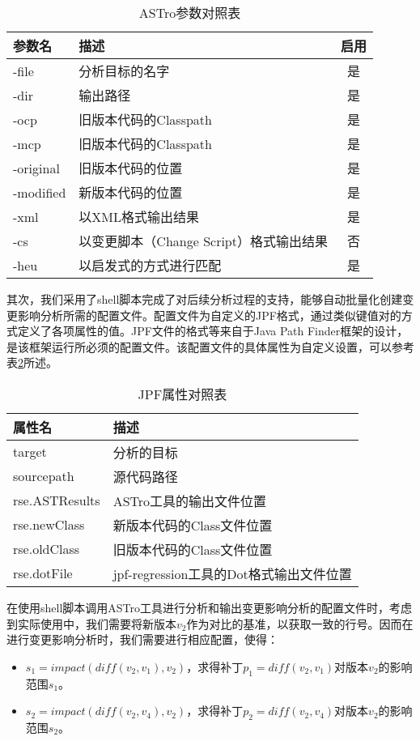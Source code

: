 \begin{table}
	\caption{ASTro参数对照表}
	\label{ASTro}
	\centering
	\begin{tabular}{llc}
		\toprule[1.5pt] 
		{\heiti 参数名} & {\heiti 描述} & {\heiti 启用}\\\midrule[1pt]
		-file & 分析目标的名字 & 是 \\
		-dir & 输出路径 & 是 \\
		-ocp & 旧版本代码的Classpath & 是\\
		-mcp & 旧版本代码的Classpath & 是\\
		-original    & 旧版本代码的位置 & 是\\
		-modified   & 新版本代码的位置 & 是\\
		-xml   & 以XML格式输出结果 & 是\\
		-cs   & 以变更脚本（Change Script）格式输出结果 & 否\\
		-heu   & 以启发式的方式进行匹配 & 是\\
		\bottomrule[1.5pt]
	\end{tabular}	
\end{table}

其次，我们采用了shell脚本完成了对后续分析过程的支持，能够自动批量化创建变更影响分析所需的配置文件。配置文件为自定义的JPF格式，通过类似键值对的方式定义了各项属性的值。JPF文件的格式等来自于Java Path Finder框架的设计，是该框架运行所必须的配置文件。该配置文件的具体属性为自定义设置，可以参考表\ref {JPF_prop}所述。

\begin{table}
	\caption{JPF属性对照表}
	\label{JPF_prop}
	\centering
	    \begin{tabular*}{\linewidth}{lp{10cm}}
	    	\toprule[1.5pt]
	    	{\heiti 属性名} & {\heiti 描述} \\\midrule[1pt]
	    	target & 分析的目标 \\
	    	sourcepath & 源代码路径\\
	    	rse.ASTResults & ASTro工具的输出文件位置\\
	    	rse.newClass & 新版本代码的Class文件位置\\
	    	rse.oldClass    & 旧版本代码的Class文件位置\\
	    	rse.dotFile   & jpf-regression工具的Dot格式输出文件位置\\
	    	\bottomrule[1.5pt]
	    \end{tabular*}
\end{table}

在使用shell脚本调用ASTro工具进行分析和输出变更影响分析的配置文件时，考虑到实际使用中，我们需要将新版本$v_2$作为对比的基准，以获取一致的行号。因而在进行变更影响分析时，我们需要进行相应配置，使得：
\begin{itemize}
	\item $s_1 = impact(diff(v_2,v_1),v_2)$，求得补丁$p_1 = diff(v_2,v_1)$对版本$v_2$的影响范围$s_1$。
	\item $s_2 = impact(diff(v_2,v_4),v_2)$，求得补丁$p_2 = diff(v_2,v_4)$对版本$v_2$的影响范围$s_2$。
\end{itemize}

